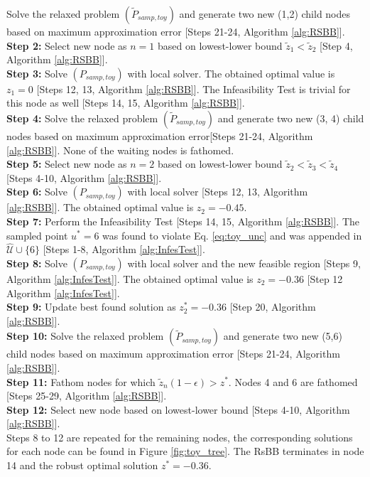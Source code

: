 \documentclass[sn-mathphys-num]{sn-jnl}
\begin{document}
Solve the relaxed problem $(\tilde{P}_{samp,toy})$ and generate two new (1,2) child nodes based on maximum approximation error [Steps 21-24, Algorithm \ref{alg:RSBB}].\\
\textbf{Step 2:}
Select new node as $n=1$ based on lowest-lower bound $\tilde{z}_1<\tilde{z}_2$ [Step 4, Algorithm \ref{alg:RSBB}].\\
\textbf{Step 3:}
Solve $(P_{samp,toy})$ with local solver. The obtained optimal value is $z_1=0$ [Steps 12, 13, Algorithm \ref{alg:RSBB}]. The Infeasibility Test is trivial for this node as well [Steps 14, 15, Algorithm \ref{alg:RSBB}].\\
\textbf{Step 4:}
Solve the relaxed problem $(\tilde{P}_{samp,toy})$ and generate two new (3, 4) child nodes based on maximum approximation error[Steps 21-24, Algorithm \ref{alg:RSBB}]. None of the waiting nodes is fathomed.\\
\textbf{Step 5:}
Select new node as $n=2$ based on lowest-lower bound $\tilde{z}_2<\tilde{z}_3<\tilde{z}_4$ [Steps 4-10, Algorithm \ref{alg:RSBB}].\\
\textbf{Step 6:}
Solve $(P_{samp,toy})$ with local solver [Steps 12, 13, Algorithm \ref{alg:RSBB}]. The obtained optimal value is $z_2=-0.45$.\\
\textbf{Step 7:}
Perform the Infeasibility Test [Steps 14, 15, Algorithm \ref{alg:RSBB}]. The sampled point $u^*=6$ was found to violate Eq. \eqref{eq:toy_unc} and was appended in $\hat{\mathcal{U}}\cup \{6\}$ [Steps 1-8, Algorithm \ref{alg:InfesTest}].\\
\textbf{Step 8:}
Solve $(P_{samp,toy})$ with local solver and the new feasible region [Steps 9, Algorithm \ref{alg:InfesTest}]. The obtained optimal value is $z_2=-0.36$ [Step 12 Algorithm \ref{alg:InfesTest}].\\
\textbf{Step 9:} 
Update best found solution as $z^*_2=-0.36$ [Step 20, Algorithm \ref{alg:RSBB}].\\
\textbf{Step 10:}
Solve the relaxed problem $(\tilde{P}_{samp,toy})$ and generate two new (5,6) child nodes based on maximum approximation error [Steps 21-24, Algorithm \ref{alg:RSBB}].\\
\textbf{Step 11:}
Fathom nodes for which $\tilde{z}_n(1-\epsilon)>z^*$. Nodes 4 and 6 are fathomed [Steps 25-29, Algorithm \ref{alg:RSBB}].\\
\textbf{Step 12:}
Select new node based on lowest-lower bound [Steps 4-10, Algorithm \ref{alg:RSBB}].\\
Steps 8 to 12 are repeated for the remaining nodes, the corresponding solutions for each node can be found in Figure \ref{fig:toy_tree}. The RsBB terminates in node 14 and the robust optimal solution $z^*=-0.36$.
\end{document}
